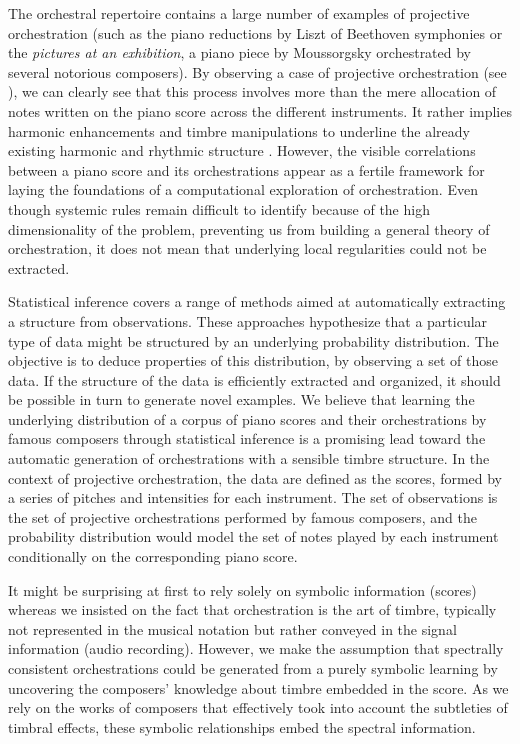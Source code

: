 \documentclass{article}
\begin{document}
The orchestral repertoire contains a large number of examples of projective orchestration (such as the piano reductions by Liszt of Beethoven symphonies or the \textit{pictures at an exhibition}, a piano piece by Moussorgsky orchestrated by several notorious composers). By observing a case of projective orchestration (see ), we can clearly see that this process involves more than the mere allocation of notes written on the piano score across the different instruments. It rather implies harmonic enhancements and timbre manipulations to underline the already existing harmonic and rhythmic structure \cite{mcadams2013timbre}. However, the visible correlations between a piano score and its orchestrations appear as a fertile framework for laying the foundations of a computational exploration of orchestration. Even though systemic rules remain difficult to identify because of the high dimensionality of the problem, preventing us from building a general theory of orchestration, it does not mean that underlying local regularities could not be extracted.

Statistical inference covers a range of methods aimed at automatically extracting a structure from observations. These approaches hypothesize that a particular type of data might be structured by an underlying probability distribution. The objective is to deduce properties of this distribution, by observing a set of those data. 
If the structure of the data is efficiently extracted and organized, it should be possible in turn to generate novel examples.
We believe that learning the underlying distribution of a corpus of piano scores and their orchestrations by famous composers through statistical inference is a promising lead toward the automatic generation of orchestrations with a sensible timbre structure.
In the context of projective orchestration, the data are defined as the scores, formed by a series of pitches and intensities for each instrument. The set of observations is the set of projective orchestrations performed by famous composers, and the probability distribution would model the set of notes played by each instrument conditionally on the corresponding piano score.

It might be surprising at first to rely solely on symbolic information (scores) whereas we insisted on the fact that orchestration is the art of timbre, typically not represented in the musical notation but rather conveyed in the signal information (audio recording).
However, we make the assumption that spectrally consistent orchestrations could be generated from a purely symbolic learning by uncovering the composers' knowledge about timbre embedded in the score. As we rely on the works of composers that effectively took into account the subtleties of timbral effects, these symbolic relationships embed the spectral information.
\end{document}
